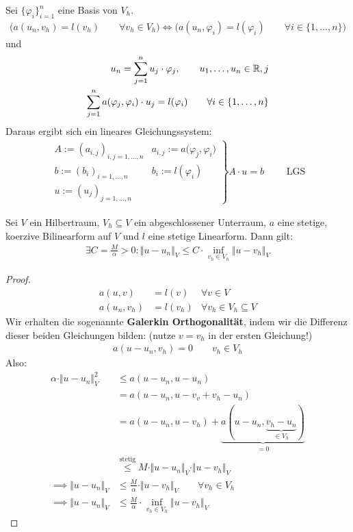 Sei $\lbrace\varphi_i\rbrace_{i=1}^n$ eine Basis von $V_h$.
\begin{align*}
\Big(a(u_n,v_h)=l(v_h)\qquad\forall v_h\in V_h\Big)\Longleftrightarrow
\Big(a(u_n,\varphi_i)=l(\varphi_i)\qquad\forall i\in\lbrace1,\ldots,n\rbrace\Big)
\end{align*}
und 
\begin{align*}
u_n=\sum\limits_{j=1}^n u_j\cdot\varphi_j,\qquad u_1,\ldots,u_n\in\mathbb{R},j\\
\sum\limits_{j=1}^n a(\varphi_j,\varphi_i)\cdot u_j=l(\varphi_i)\qquad\forall i\in\lbrace1,\ldots,n\rbrace\\
\end{align*}
Daraus ergibt sich ein lineares Gleichungssystem:
\begin{align*}
\left.\begin{array}{ll}
A:=(a_{i,j})_{i,j=1,\ldots,n} &a_{i,j}:=a\big(\varphi_j,\varphi_i\big)\\
b:=(b_i)_{i=1,\ldots,n} &b_i:=l(\varphi_i)\\
u:=(u_j)_{j=1,\ldots,n}
\end{array}\right\rbrace A\cdot u=b\qquad\text{ LGS}
\end{align*}

\begin{theorem}\enter
Sei $V$ ein Hilbertraum, $V_h\subseteq V$ ein abgeschlossener Unterraum, $a$ eine stetige, koerzive Bilinearform auf $V$ und $l$ eine stetige Linearform. Dann gilt:
\begin{align*}
\exists C=\frac{M}{\alpha}>0:\Vert u-u_n\Vert_V\leq C\cdot\inf\limits_{v_h\in V_h}\Vert u-v_h\Vert_V
\end{align*}
\end{theorem}
\begin{proof}
\begin{align*}
a(u,v)&=l(v) &\forall v\in V\\
a(u_n,v_h)&= l(v_h) &\forall v_h\in V_h\subseteq V
\end{align*}
Wir erhalten die sogenannte \textbf{Galerkin Orthogonalität}, indem wir die Differenz dieser beiden Gleichungen bilden: (nutze $v=v_h$ in der ersten Gleichung!) 
\begin{align}\label{eqGalerkinOrthogonalitaet}\tag{GalerkinOrtho}
a(u-u_n,v_h)=0\qquad v_h\in V_h
\end{align}
Also:
\begin{align*}
\alpha\cdot\Vert u-u_n\Vert^2_V
&\leq
a(u-u_n,u-u_n)\\
&=a(u-u_n,u-v_v+v_h- u_n)\\
&=a(u-u_n,u-v_h)+\underbrace{a(u-u_n,\underbrace{v_h-u_n}_{\in V_h})}_{=0}\\
&\stackrel{\text{stetig}}{\leq}
M\cdot\Vert u-u_n\Vert_V\cdot\Vert u-v_h\Vert_V\\
\implies
\Vert u-u_n\Vert_V&\leq\frac{M}{\alpha}\cdot\Vert u-v_h\Vert_V\qquad\forall v_h\in V_h\\
\implies
\Vert u-u_n\Vert_V&\leq \frac{M}{\alpha}\cdot\inf\limits_{v_h\in V_h}\Vert u-v_h\Vert_V
\end{align*}
\end{proof}

